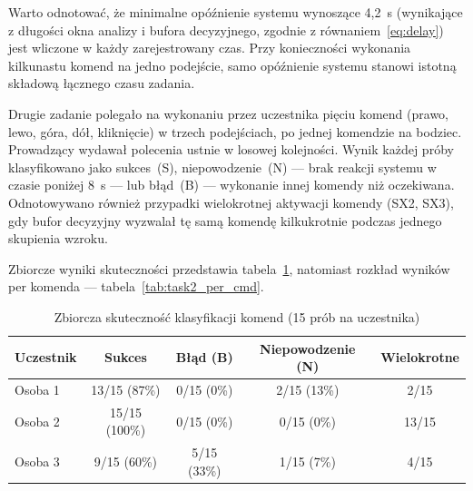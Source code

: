 Warto odnotować, że minimalne opóźnienie systemu wynoszące 4,2~s
(wynikające z długości okna analizy i bufora decyzyjnego, zgodnie
z równaniem~\ref{eq:delay}) jest wliczone w każdy zarejestrowany czas.
Przy konieczności wykonania kilkunastu komend na jedno podejście,
samo opóźnienie systemu stanowi istotną składową łącznego czasu zadania.

Drugie zadanie polegało na wykonaniu przez uczestnika pięciu komend
(prawo, lewo, góra, dół, kliknięcie) w trzech podejściach,
po jednej komendzie na bodziec. Prowadzący wydawał polecenia ustnie
w losowej kolejności. Wynik każdej próby
klasyfikowano jako sukces~(S), niepowodzenie~(N) --- brak reakcji systemu
w czasie poniżej 8~s --- lub błąd~(B) --- wykonanie innej komendy
niż oczekiwana. Odnotowywano również przypadki wielokrotnej
aktywacji komendy (SX2, SX3), gdy bufor decyzyjny wyzwalał
tę samą komendę kilkukrotnie podczas jednego skupienia wzroku.

Zbiorcze wyniki skuteczności przedstawia tabela~\ref{tab:task2_summary},
natomiast rozkład wyników per komenda --- tabela~\ref{tab:task2_per_cmd}.

\begin{table}[!ht]
\centering
\caption{Zbiorcza skuteczność klasyfikacji komend (15 prób na uczestnika)}
\label{tab:task2_summary}
\begin{tabular}{lcccc}
    \toprule
    \textbf{Uczestnik} & \textbf{Sukces} & \textbf{Błąd (B)}
        & \textbf{Niepowodzenie (N)} & \textbf{Wielokrotne} \\
    \midrule
    Osoba 1 & 13/15 (87\%) & 0/15 (0\%)  & 2/15 (13\%) & 2/15 \\
    Osoba 2 & 15/15 (100\%) & 0/15 (0\%) & 0/15 (0\%)  & 13/15 \\
    Osoba 3 & 9/15 (60\%)  & 5/15 (33\%) & 1/15 (7\%)  & 4/15 \\
    \bottomrule
\end{tabular}
\end{table}

